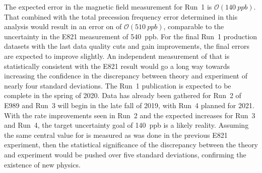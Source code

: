 The expected error in the magnetic field measurement for Run~1 is $\mathcal{O}(\SI{140}{ppb})$. That combined with the total precession frequency error determined in this analysis would result in an error on \amu of $\mathcal{O}(\SI{510}{ppb})$, comparable to the uncertainty in the E821 measurement of \SI{540}{ppb}. For the final Run~1 production datasets with the last data quality cuts and gain improvements, the final errors are expected to improve slightly. An independent measurement of \amu that is statistically consistent with the E821 result would go a long way towards increasing the confidence in the discrepancy between theory and experiment of nearly four standard deviations. The Run~1 publication is expected to be complete in the spring of 2020. Data has already been gathered for Run~2 of E989 and Run~3 will begin in the late fall of 2019, with Run~4 planned for 2021. With the rate improvements seen in Run~2 and the expected increases for Run~3 and Run~4, the target uncertainty goal of \SI{140}{ppb} is a likely reality. Assuming the same central value for \amu is measured as was done in the previous E821 experiment, then the statistical significance of the discrepancy between the theory and experiment would be pushed over five standard deviations, confirming the existence of new physics.






